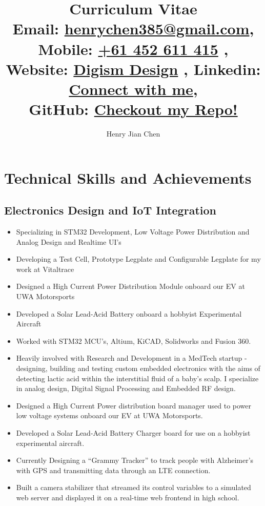 \documentclass{article}[a4page]
\title{
Curriculum Vitae \\
\small{Email: \href{mailto:henrychen385@gmail.com}{henrychen385@gmail.com}}, 
\small{Mobile: \href{tel:61452611415}{+61 452 611 415} }, \\
\small{Website:  \href{https://digism.xyz}{Digism Design} },
\small{Linkedin: \href{https://www.linkedin.com/in/henry-chen-21b672176/}{Connect with me}},\\
\small{GitHub: \href{https://github.com/jumper385}{Checkout my Repo!}}
}
\author{Henry Jian Chen}
\begin{document}
\maketitle
{}

\section*{Technical Skills and Achievements}
\subsection*{Electronics Design and IoT Integration}
\begin{itemize}
    \item Specializing in STM32 Development, Low Voltage Power Distribution and Analog Design and Realtime UI's
    \item Developing a Test Cell, Prototype Legplate and Configurable Legplate for my work at Vitaltrace
    \item Designed a High Current Power Distribution Module onboard our EV at UWA Motorsports
    \item Developed a Solar Lead-Acid Battery onboard a hobbyist Experimental Aircraft
\item Worked with STM32 MCU's, Altium, KiCAD, Solidworks and Fusion 360.
\item Heavily involved with Research and Development in a MedTech startup - designing, building and testing custom embedded electronics with the aims of detecting lactic acid within the interstitial fluid of a baby's scalp. I specialize in analog design, Digital Signal Processing and Embedded RF design.
\item Designed a High Current Power distribution board manager used to power low voltage systems onboard our EV at UWA Motorsports.
\item Developed a Solar Lead-Acid Battery Charger board for use on a hobbyist experimental aircraft.
\item Currently Designing a ``Grammy Tracker'' to track people with Alzheimer's with GPS and transmitting data through an LTE connection.
\item Built a camera stabilizer that streamed its control variables to a simulated web server and displayed it on a real-time web frontend in high school.
\end{itemize}
\end{document}
